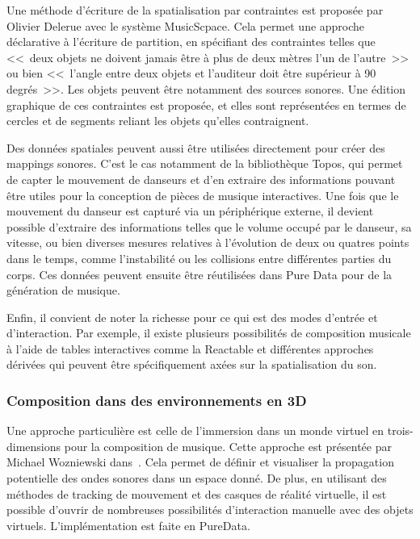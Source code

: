 \documentclass[french,12pt]{article}
\begin{document}
Une méthode d'écriture de la spatialisation par contraintes est proposée par Olivier Delerue avec le système MusicScpace\cite{delerue_spatialisation_2004}. Cela permet une approche déclarative à l'écriture de partition, en spécifiant des contraintes telles que <<~deux objets ne doivent jamais être à plus de deux mètres l'un de l'autre~>> ou bien <<~l'angle entre deux objets et l'auditeur doit être supérieur à 90 degrés~>>. Les objets peuvent être notamment des sources sonores. Une édition graphique de ces contraintes est proposée, et elles sont représentées en termes de cercles et de segments reliant les objets qu'elles contraignent.

Des données spatiales peuvent aussi être utilisées directement pour créer des mappings sonores. C'est le cas notamment de la bibliothèque Topos\cite{naveda_topos_2014}, qui permet de capter le mouvement de danseurs et d'en extraire des informations pouvant être utiles pour la conception de pièces de musique interactives. Une fois que le mouvement du danseur est capturé via un périphérique externe, il devient possible d'extraire des informations telles que le volume occupé par le danseur, sa vitesse, ou bien diverses mesures relatives à l'évolution de deux ou quatres points dans le temps, comme l'instabilité ou les collisions entre différentes parties du corps. Ces données peuvent ensuite être réutilisées dans Pure Data pour de la génération de musique.

Enfin, il convient de noter la richesse pour ce qui est des modes d'entrée et d'interaction. Par exemple, il existe plusieurs possibilités de composition musicale à l'aide de tables interactives comme la Reactable\cite{kaltenbranner_reactable:_2006} et différentes approches dérivées qui peuvent être spécifiquement axées sur la spatialisation du son\cite{sasamoto_controlling_2013}.

\subsubsection{Composition dans des environnements en 3D}
Une approche particulière est celle de l'immersion dans un monde virtuel en trois-dimensions pour la composition de musique. Cette approche est présentée par Michael Wozniewski dans~\cite{wozniewski_framework_2006}. Cela permet de définir et visualiser la propagation potentielle des ondes sonores dans un espace donné. De plus, en utilisant des méthodes de tracking de mouvement et des casques de réalité virtuelle, il est possible d'ouvrir de nombreuses possibilités d'interaction manuelle avec des objets virtuels. L'implémentation est faite en PureData.
\end{document}

